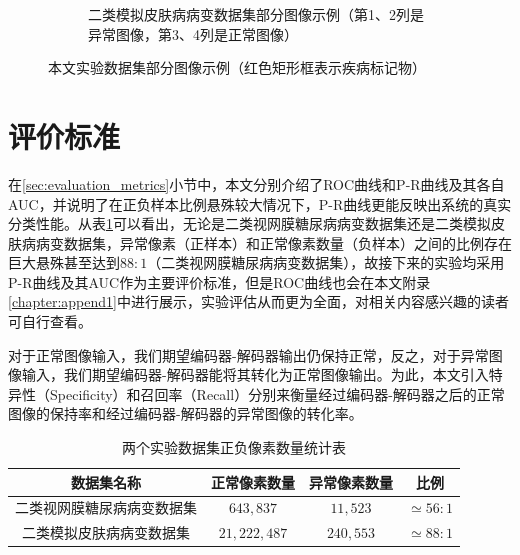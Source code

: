 \begin{figure}[h]
\begin{subfigure}{0.48\textwidth}
		\caption{二类模拟皮肤病病变数据集部分图像示例（第1、2列是异常图像，第3、4列是正常图像）}
		\label{subfig:bin_simulate_skin_example}
	\end{subfigure}
	\caption{本文实验数据集部分图像示例（红色矩形框表示疾病标记物）}
	\label{mul_fig:bin_ds_example}
\end{figure}
\section{评价标准}\label{sec:exper_evaluation_metrics}

在\ref{sec:evaluation_metrics}小节中，本文分别介绍了ROC曲线和P-R曲线及其各自AUC，并说明了在正负样本比例悬殊较大情况下，P-R曲线更能反映出系统的真实分类性能。从表\ref{tab:bin_ds_pixel_freqs}可以看出，无论是二类视网膜糖尿病病变数据集还是二类模拟皮肤病病变数据集，异常像素（正样本）和正常像素数量（负样本）之间的比例存在巨大悬殊甚至达到$88:1$（二类视网膜糖尿病病变数据集），故接下来的实验均采用P-R曲线及其AUC作为主要评价标准，但是ROC曲线也会在本文附录\ref{chapter:append1}中进行展示，实验评估从而更为全面，对相关内容感兴趣的读者可自行查看。

对于正常图像输入，我们期望编码器-解码器输出仍保持正常，反之，对于异常图像输入，我们期望编码器-解码器能将其转化为正常图像输出。为此，本文引入特异性（Specificity）和召回率（Recall）分别来衡量经过编码器-解码器之后的正常图像的保持率和经过编码器-解码器的异常图像的转化率。

\begin{table}[h]
	\centering
	\caption{两个实验数据集正负像素数量统计表}
	\label{tab:bin_ds_pixel_freqs}
	\begin{tabular}{c|c|c|c}
		\toprule[2pt]
		数据集名称 & 正常像素数量 & 异常像素数量 & 比例 \\
		\midrule[2pt]
		二类视网膜糖尿病病变数据集&  $643,837$ & $11,523$ & $\simeq 56: 1$ \\ \hline
		二类模拟皮肤病病变数据集 & $21,222,487$ & $240,553$ & $\simeq 88: 1$ \\
		\bottomrule[2pt]
	\end{tabular}
\end{table}


